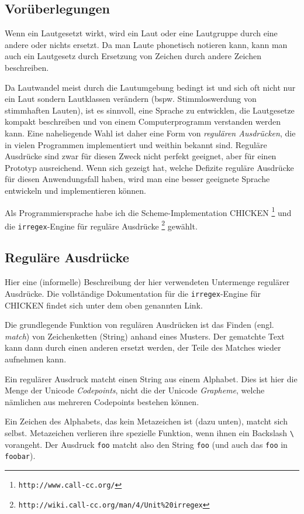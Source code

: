 \documentclass[12pt,a4paper,normalheadings]{scrartcl}
\def\bel#1{\textit{#1}}
\def\tt#1{\texttt{#1}}
\begin{document}
\subsection{Vorüberlegungen}

Wenn ein Lautgesetzt wirkt,
wird ein Laut oder eine Lautgruppe durch eine andere oder nichts ersetzt.
Da man Laute phonetisch notieren kann,
kann man auch ein Lautgesetz durch Ersetzung
von Zeichen durch andere Zeichen beschreiben.

Da Lautwandel meist durch die Lautumgebung bedingt ist
und sich oft nicht nur ein Laut sondern Lautklassen verändern
(bspw. Stimmloswerdung von stimmhaften Lauten),
ist es sinnvoll,
eine Sprache zu entwicklen,
die Lautgesetze kompakt beschreiben
und von einem Computerprogramm verstanden werden kann.
Eine naheliegende Wahl ist daher eine Form von \emph{regulären Ausdrücken},
die in vielen Programmen implementiert und weithin bekannt sind.
Reguläre Ausdrücke sind zwar für diesen Zweck nicht perfekt geeignet,
aber für einen Prototyp ausreichend.
Wenn sich gezeigt hat,
welche Defizite reguläre Ausdrücke für diesen Anwendungsfall haben,
wird man eine besser geeignete Sprache entwickeln und implementieren können.

Als Programmiersprache habe ich die Scheme-Implementation CHICKEN
\footnote{\tt{http://www.call-cc.org/}}
und die \tt{irregex}-Engine für reguläre Ausdrücke
\footnote{\tt{http://wiki.call-cc.org/man/4/Unit\%20irregex}}
gewählt.

\subsection{Reguläre Ausdrücke}

Hier eine (informelle)
Beschreibung der hier verwendeten Untermenge regulärer Ausdrücke.
Die vollständige Dokumentation für die \tt{irregex}-Engine für
CHICKEN findet sich unter dem oben genannten Link.

Die grundlegende Funktion von regulären Ausdrücken ist das
Finden (engl. \bel{match}) von Zeichenketten (String) anhand eines Musters.
Der gematchte Text kann dann durch einen anderen ersetzt werden,
der Teile des Matches wieder aufnehmen kann.

Ein regulärer Ausdruck matcht einen String aus einem Alphabet.
Dies ist hier die Menge der Unicode \emph{Codepoints}, nicht die
der Unicode \emph{Grapheme},
welche nämlichen aus mehreren Codepoints bestehen können.

Ein Zeichen des Alphabets, das kein Metazeichen ist (dazu unten),
matcht sich selbst.
Metazeichen verlieren ihre spezielle Funktion,
wenn ihnen ein Backslash \tt{\textbackslash} vorangeht.
Der Ausdruck \tt{foo} matcht also den String \tt{foo}
(und auch das \tt{foo} in \tt{foobar}).
\end{document}
